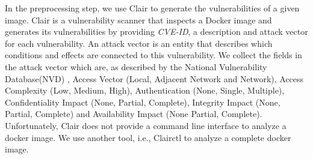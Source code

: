 In the preprocessing step, we use Clair to generate the vulnerabilities of a given image. Clair is a vulnerability scanner that inspects a Docker image and generates its vulnerabilities by providing \textit{CVE-ID}, a description and attack vector for each vulnerability. An attack vector is an entity that describes which conditions and effects are connected to this vulnerability. We collect the fields in the attack vector which are,  as described by the National Vulnerability Database(NVD) \cite{booth2013national}, Access Vector (Local, Adjacent Network and Network), Access Complexity (Low, Medium, High), Authentication (None, Single, Multiple), Confidentiality Impact (None, Partial, Complete), Integrity Impact (None, Partial, Complete) and Availability Impact (None Partial, Complete). Unfortunately, Clair does not provide a command line interface to analyze a docker image. We use another tool, i.e.,  Clairctl  to analyze a complete docker image.

